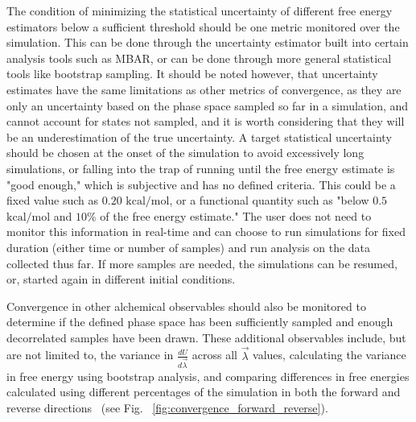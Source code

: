 \documentclass[9pt,bestpractices]{livecoms}
\begin{document}
The condition of minimizing the statistical uncertainty of different free energy estimators below a sufficient threshold should be one metric monitored over the simulation. This can be done through the uncertainty estimator built into certain analysis tools such as MBAR, or can be done through more general statistical tools like bootstrap sampling. It should be noted however, that uncertainty estimates have the same limitations as other metrics of convergence, as they are only an uncertainty based on the phase space sampled so far in a simulation, and cannot account for states not sampled, and it is worth considering that they will be an underestimation of the true uncertainty.
A target statistical uncertainty should be chosen at the onset of the simulation to avoid excessively long simulations, or falling into the trap of running until the free energy estimate is "good enough," which is subjective and has no defined criteria. This could be a fixed value such as $0.20$ $\mathrm{kcal/mol}$, or a functional quantity such as "below $0.5$ $\mathrm{kcal/mol}$ and $10\%$ of the free energy estimate." The user does not need to monitor this information in real-time and can choose to run simulations for fixed duration (either time or number of samples) and run analysis on the data collected thus far. If more samples are needed, the simulations can be resumed, or, started again in different initial conditions. 

Convergence in other alchemical observables should also be monitored to determine if the defined phase space has been sufficiently sampled and enough decorrelated samples have been drawn. These additional observables include, but are not limited to, the variance in $\frac{dU}{d\vec{\lambda}}$ across all $\vec{\lambda}$ values, calculating the variance in free energy using bootstrap analysis, and comparing differences in free energies calculated using different percentages of the simulation in both the forward and reverse directions~\cite{klimovich2015guidelines} (see Fig. ~\ref{fig:convergence_forward_reverse}).
\end{document}
